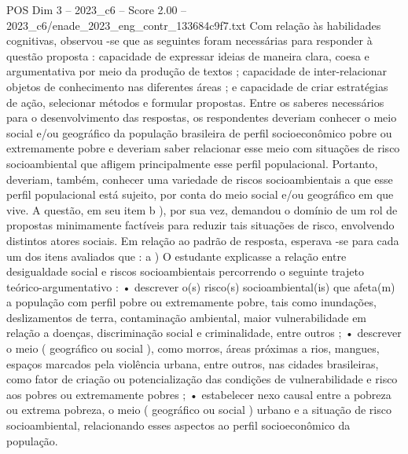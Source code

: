 \begin{textsample}{POS Dim 3 – 2023\_c6 – Score 2.00 – 2023\_c6/enade\_2023\_eng\_contr\_133684c9f7.txt}
Com relação às habilidades cognitivas, observou -se que as seguintes foram necessárias para responder à questão proposta : capacidade de expressar ideias de maneira clara, coesa e argumentativa por meio da produção de textos ; capacidade de inter-relacionar objetos de conhecimento nas diferentes áreas ; e capacidade de criar estratégias de ação, selecionar métodos e formular propostas.
Entre os saberes necessários para o desenvolvimento das respostas, os respondentes deveriam conhecer o meio social e/ou geográfico da população brasileira de perfil socioeconômico pobre ou extremamente pobre e deveriam saber relacionar esse meio com situações de risco socioambiental que afligem principalmente esse perfil populacional.
Portanto, deveriam, também, conhecer uma variedade de riscos socioambientais a que esse perfil populacional está sujeito, por conta do meio social e/ou geográfico em que vive.
A questão, em seu item b ), por sua vez, demandou o domínio de um rol de propostas minimamente factíveis para reduzir tais situações de risco, envolvendo distintos atores sociais.
Em relação ao padrão de resposta, esperava -se para cada um dos itens avaliados que : a ) O estudante explicasse a relação entre desigualdade social e riscos socioambientais percorrendo o seguinte trajeto teórico-argumentativo : • descrever o(s) risco(s) socioambiental(is) que afeta(m) a população com perfil pobre ou extremamente pobre, tais como inundações, deslizamentos de terra, contaminação ambiental, maior vulnerabilidade em relação a doenças, discriminação social e criminalidade, entre outros ; • descrever o meio ( geográfico ou social ), como morros, áreas próximas a rios, mangues, espaços marcados pela violência urbana, entre outros, nas cidades brasileiras, como fator de criação ou potencialização das condições de vulnerabilidade e risco aos pobres ou extremamente pobres ; • estabelecer nexo causal entre a pobreza ou extrema pobreza, o meio ( geográfico ou social ) urbano e a situação de risco socioambiental, relacionando esses aspectos ao perfil socioeconômico da população.

\end{textsample}
